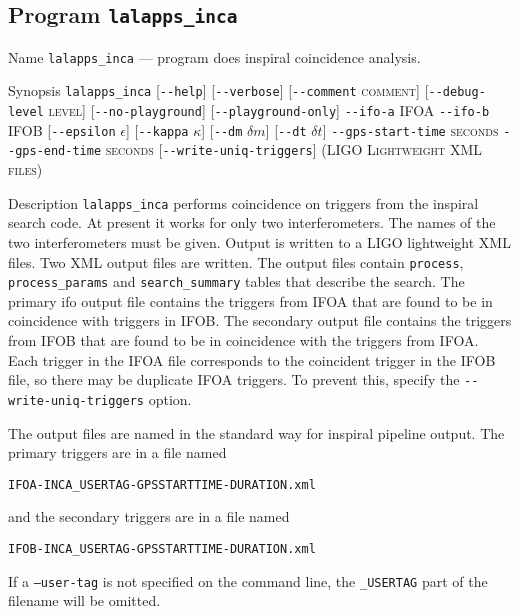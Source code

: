 \subsection{Program \texttt{lalapps\_inca}}
\label{program:lalapps-inca}

\begin{entry}
\item[Name]
\verb$lalapps_inca$ --- program does inspiral coincidence analysis.

\item[Synopsis]
\verb$lalapps_inca$ 
[\verb$--help$]
[\verb$--verbose$]
[\verb$--comment$ \textsc{comment}]
[\verb$--debug-level$ \textsc{level}] \newline
%
[\verb$--no-playground$]
[\verb$--playground-only$]
\verb$--ifo-a$ \textsc{IFOA} 
\verb$--ifo-b$ \textsc{IFOB} \newline
%
[\verb$--epsilon$ \textsc{$\epsilon$}]
[\verb$--kappa$ \textsc{$\kappa$}]
[\verb$--dm$ \textsc{$\delta m$}]
[\verb$--dt$ \textsc{$\delta t$}] \newline
%
\verb$--gps-start-time$ \textsc{seconds} 
\verb$--gps-end-time$ \textsc{seconds} 
[\verb$--write-uniq-triggers$] \newline
%
\textsc{(LIGO Lightweight XML files)}

\item[Description] 
\verb$lalapps_inca$ performs coincidence on triggers from the inspiral
search code.  At present it works for only two interferometers. The names
of the two interferometers must be given. Output is written to a LIGO
lightweight XML files. Two XML output files are written.  The output files
contain \texttt{process}, \texttt{process\_params} and
\texttt{search\_summary} tables that describe the search. The primary ifo
output file contains the triggers from \textsc{IFOA} that are found to be in
coincidence with triggers in \textsc{IFOB}. The secondary output file contains
the triggers from \textsc{IFOB} that are found to be in coincidence with the
triggers from \textsc{IFOA}.  Each trigger in the \textsc{IFOA} file
corresponds to the coincident trigger in the \textsc{IFOB} file, so there may
be duplicate  \textsc{IFOA} triggers.  To prevent this, specify the
\verb$--write-uniq-triggers$ option.

The output files are named in the standard way for inspiral pipeline output.
The primary triggers are in a file named\\
\begin{center}
\texttt{IFOA-INCA\_USERTAG-GPSSTARTTIME-DURATION.xml}\\
\end{center}
and the secondary triggers are in a file named\\
\begin{center}
\texttt{IFOB-INCA\_USERTAG-GPSSTARTTIME-DURATION.xml}\\
\end{center}
If a \texttt{--user-tag} is not specified on the command line, the
\texttt{\_USERTAG} part of the filename will be omitted.


\end{entry}

